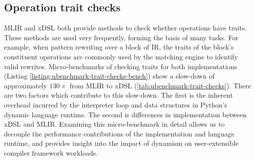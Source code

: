 \subsection{Operation trait checks}
\label{ssec:ubenchmark-trait-checks}


MLIR and xDSL both provide methods to check whether operations have traits.
These methods are used very frequently, forming the basis of many tasks. For example, when pattern rewriting over a block of IR, the traits of the block's constituent operations are commonly used by the matching engine to identify valid rewrites.
Micro-benchmarks of checking traits for both implementations (Listing \ref{listing:ubenchmark-trait-checks-bench}) show a slow-down of approximately $130\times$ from MLIR to xDSL (\autoref{tab:ubenchmark-trait-checks}). There are two factors which contribute to this slow-down. The first is the inherent overhead incurred by the interpreter loop and data structures in Python's dynamic language runtime. The second is differences in implementation between xDSL and MLIR.
Examining this micro-benchmark in detail allows us to decouple the performance contributions of the implementation and language runtime, and provides insight into the impact of dynamism on user-extensible compiler framework workloads.


